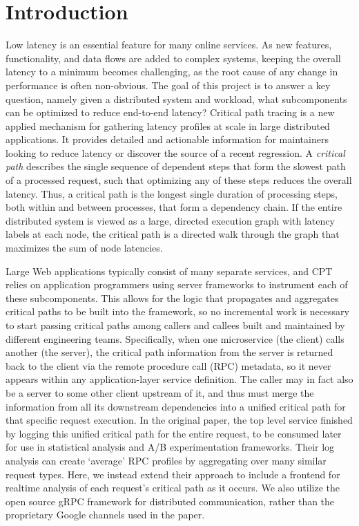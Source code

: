 \documentclass[11pt, twoside, twocolumn]{extarticle}
\begin{document}
\section{Introduction}
Low latency is an essential feature for many online services.  As new features, functionality, and data flows are added to complex systems, keeping the overall latency to a minimum becomes challenging, as the root cause of any change in performance is often non-obvious. The goal of this project is to answer a key question, namely given a distributed system and workload, what subcomponents can be optimized to reduce end-to-end latency? 
Critical path tracing is a new applied mechanism for gathering latency profiles at scale in large distributed applications\cite{10.1145/3526967}. It provides detailed and actionable information for maintainers looking to reduce latency or discover the source of a recent regression.  A \textit{critical path} describes the single sequence of dependent steps that form the slowest path of a processed request, such that optimizing any of these steps reduces the overall latency. Thus, a critical path is the longest single duration of processing steps, both within and between processes, that form a dependency chain.  If the entire distributed system is viewed as a large, directed execution graph with latency labels at each node, the critical path is a directed walk through the graph that maximizes the sum of node latencies.  

Large Web applications typically consist of many separate services, and CPT relies on application programmers using server frameworks to instrument each of these subcomponents.  This allows for the logic that propagates and aggregates critical paths to be built into the framework, so no incremental work is necessary to start passing critical paths among callers and callees built and maintained by different engineering teams.  Specifically, when one microservice (the client) calls another (the server), the critical path information from the server is returned back to the client via the remote procedure call (RPC) metadata, so it never appears within any application-layer service definition.  The caller may in fact also be a server to some other client upstream of it, and thus must merge the information from all its downstream dependencies into a unified critical path for that specific request execution. In the original paper, the top level service finished by logging this unified critical path for the entire request, to be consumed later for use in statistical analysis and A/B experimentation frameworks.  Their log analysis can create `average' RPC profiles by aggregating over many similar request types.  Here, we instead extend their approach to include a frontend for realtime analysis of each request's critical path as it occurs.  We also utilize the open source gRPC framework for distributed communication, rather than the proprietary Google channels used in the paper.
\end{document}
